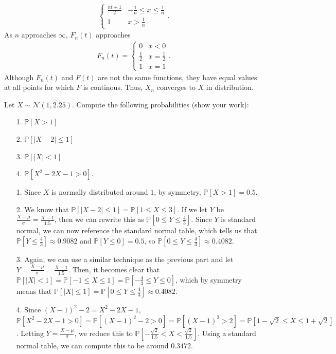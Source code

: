 \documentclass[a4paper]{article}
\begin{document}
\begin{Solution}
\begin{itemize}
\begin{align*}
\begin{cases}
					\frac{nt + 1}{2} & -\frac{1}{n} \le x \le \frac{1}{n} \\ 
					1 & x > \frac{1}{n}
				\end{cases}.
			\end{align*}
			As $n$ approaches $\infty$, $F_n(t)$ approaches
			\begin{align*}
				F_n(t) = \begin{cases}
					0 & x < 0 \\
					\frac{1}{2} & x = \frac{1}{2} \\
					1 & x = 1
				\end{cases}.
			\end{align*}
			Although $F_n(t)$ and $F(t)$ are not the same functions, they have equal values at all points for which $F$ is continous. Thus, $X_n$ converges to $X$ in distribution. 
	\end{itemize}
\end{Solution}
\begin{Exercise}
Let $X \sim \mathcal{N}(1, 2.25)$. Compute the following probabilities (show your work):
\begin{itemize}
	\item[1.] $\mathbb{P}[X > 1]$
	\item[2.] $\mathbb{P}[|X - 2| \le 1]$
	\item[3.] $\mathbb{P}[|X| < 1]$
	\item[4.] $\mathbb{P}[X^2 - 2X - 1 > 0]$.
\end{itemize}
\end{Exercise}
\begin{Solution}
	\begin{itemize}
		\item[1.] Since $X$ is normally distributed around $1$, by symmetry, $\mathbb{P}[X > 1] = 0.5.$ 
		\item[2.] We know that $\mathbb{P}[|X - 2| \le 1] = \mathbb{P}[1 \le X \le 3]$. If we let $Y$ be $\frac{X - \mu}{\sigma} = \frac{X - 1}{1.5}$, then we can rewrite this as $\mathbb{P}\left[0 \le Y \le \frac{4}{3}\right]$. Since $Y$ is standard normal, we can now reference the standard normal table, which tells us that $\mathbb{P}\left[Y \le \frac{4}{3}\right] \approx 0.9082$ and $\mathbb{P}\left[Y \le 0\right] = 0.5$, so $\mathbb{P}\left[0 \le Y \le \frac{4}{3}\right] \approx 0.4082.$
		\item[3.] Again, we can use a similar technique as the previous part and let $Y= \frac{X - \mu}{\sigma} = \frac{X - 1}{1.5}$. Then, it becomes clear that $\mathbb{P}[|X| < 1] =\mathbb{P}[-1 \le X \le 1] =\mathbb{P}\left[ -\frac{4}{3} \le Y \le 0 \right]$, which by symmetry means that $\mathbb{P}[|X| \le 1] = \mathbb{P}\left[0 \le Y \le \frac{4}{3}\right] \approx 0.4082.$
		\item[4.] Since $(X - 1)^2 - 2 = X^2 - 2X - 1$, $\mathbb{P}[X^2 - 2X - 1 > 0] = \mathbb{P}[(X - 1)^2 - 2 > 0] = \mathbb{P}[(X - 1)^2 > 2] = \mathbb{P}[1 - \sqrt{2} \le X \le 1 + \sqrt{2}]$. Letting $Y = \frac{X - \mu}{\sigma}$, we reduce this to $\mathbb{P}\left[-\frac{\sqrt{2}}{1.5} < X < \frac{\sqrt{2}}{1.5}\right]$. Using a standard normal table, we can compute this to be around $0.3472$.
	\end{itemize}
\end{Solution}
\end{document}
